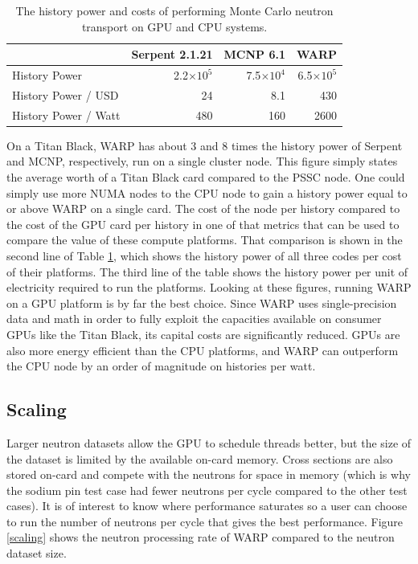 \documentclass[preprint,12pt]{elsarticle}
\begin{document}
\begin{table}[h]
\centering
\caption{The history power and costs of performing Monte Carlo neutron transport on GPU and CPU systems.}
\label{history_power}
\small
\begin{tabular}{| l | r | r | r |}
\hline
              &  Serpent 2.1.21 & MCNP 6.1 & WARP  \\
\hline
History Power   &  2.2$\times10^5$	 & 7.5$\times10^4$	 & 6.5$\times10^5$    \\
\hline
History Power / USD    & 24 & 	8.1	 & 430    \\
\hline
History Power / Watt   & 480	 & 160	 & 2600    \\
\hline
\end{tabular}
\end{table}

On a Titan Black, WARP has about 3 and 8 times the history power of Serpent and MCNP, respectively, run on a single cluster node.  This figure simply states the average worth of a Titan Black card compared to the PSSC node.  One could simply use more NUMA nodes to the CPU node to gain a history power equal to or above WARP on a single card. 
 The cost of the node per history compared to the cost of the GPU card per history  in one of that metrics that can be used to compare the value of these compute platforms.  That comparison is shown in the second line of Table \ref{history_power}, which shows the history power of all three codes per cost of their platforms.  The third line of the table shows the history power per unit of electricity required to run the platforms.  Looking at these figures, running WARP on a GPU platform is by far the best choice.  Since WARP uses single-precision data and math in order to fully exploit the capacities available on consumer GPUs like the Titan Black, its capital costs are significantly reduced.  GPUs are also more energy efficient than the CPU platforms, and WARP can outperform the CPU node by an order of magnitude on histories per watt.

\subsection{Scaling}

Larger neutron datasets allow the GPU to schedule threads better, but the size of the dataset is limited by the available on-card memory.  Cross sections are also stored on-card and compete with the neutrons for space in memory (which is why the sodium pin test case had fewer neutrons per cycle compared to the other test cases).  It is of interest to know where performance saturates so a user can choose to run the number of neutrons per cycle that gives the best performance.  Figure \ref{scaling} shows the neutron processing rate of WARP compared to the neutron dataset size.
\end{document}
